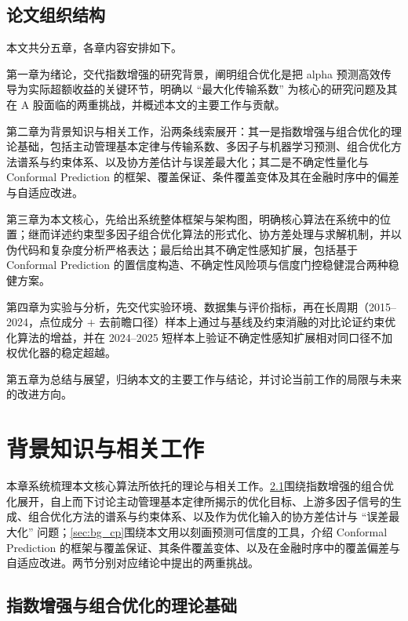 \section{论文组织结构}

本文共分五章，各章内容安排如下。

第一章为绪论，交代指数增强的研究背景，阐明组合优化是把 alpha 预测高效传导为实际超额收益的关键环节，明确以 ``最大化传输系数'' 为核心的研究问题及其在 A 股面临的两重挑战，并概述本文的主要工作与贡献。

第二章为背景知识与相关工作，沿两条线索展开：其一是指数增强与组合优化的理论基础，包括主动管理基本定律与传输系数、多因子与机器学习预测、组合优化方法谱系与约束体系、以及协方差估计与误差最大化；其二是不确定性量化与 Conformal Prediction 的框架、覆盖保证、条件覆盖变体及其在金融时序中的偏差与自适应改进。

第三章为本文核心，先给出系统整体框架与架构图，明确核心算法在系统中的位置；继而详述约束型多因子组合优化算法的形式化、协方差处理与求解机制，并以伪代码和复杂度分析严格表达；最后给出其不确定性感知扩展，包括基于 Conformal Prediction 的置信度构造、不确定性风险项与信度门控稳健混合两种稳健方案。

第四章为实验与分析，先交代实验环境、数据集与评价指标，再在长周期（2015--2024，点位成分 $+$ 去前瞻口径）样本上通过与基线及约束消融的对比论证约束优化算法的增益，并在 2024--2025 短样本上验证不确定性感知扩展相对同口径不加权优化器的稳定超越。

第五章为总结与展望，归纳本文的主要工作与结论，并讨论当前工作的局限与未来的改进方向。

\chapter{背景知识与相关工作}

本章系统梳理本文核心算法所依托的理论与相关工作。\ref{sec:bg_po}围绕指数增强的组合优化展开，自上而下讨论主动管理基本定律所揭示的优化目标、上游多因子信号的生成、组合优化方法的谱系与约束体系、以及作为优化输入的协方差估计与 ``误差最大化'' 问题；\ref{sec:bg_cp}围绕本文用以刻画预测可信度的工具，介绍 Conformal Prediction 的框架与覆盖保证、其条件覆盖变体、以及在金融时序中的覆盖偏差与自适应改进。两节分别对应绪论中提出的两重挑战。

\section{指数增强与组合优化的理论基础}
\label{sec:bg_po}

